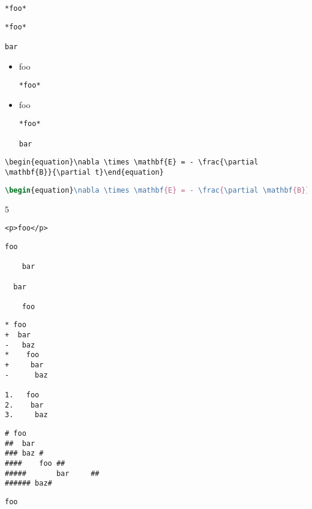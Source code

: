 
\def\mytitle{Fenced Code Blocks}


\begin{verbatim}
*foo*
\end{verbatim}

\begin{verbatim}
*foo*

bar
\end{verbatim}

\begin{itemize}
\item foo

\begin{verbatim}
*foo*
\end{verbatim}

\item foo

\begin{verbatim}
*foo*

bar
\end{verbatim}

\end{itemize}

\begin{verbatim}
\begin{equation}\nabla \times \mathbf{E} = - \frac{\partial \mathbf{B}}{\partial t}\end{equation}
\end{verbatim}

\begin{lstlisting}[language=tex]
\begin{equation}\nabla \times \mathbf{E} = - \frac{\partial \mathbf{B}}{\partial t}\end{equation}
\end{lstlisting}

5

\begin{verbatim}
<p>foo</p>
\end{verbatim}

\begin{verbatim}
foo

	bar

  bar

    foo
\end{verbatim}

\begin{verbatim}
* foo
+  bar
-   baz
*    foo
+     bar
-      baz

1.   foo
2.    bar
3.     baz
\end{verbatim}

\begin{verbatim}
# foo
##	bar
### baz #
####	foo	##  
#####		bar		##	
###### baz#
\end{verbatim}

\begin{verbatim}
foo
\end{verbatim}



